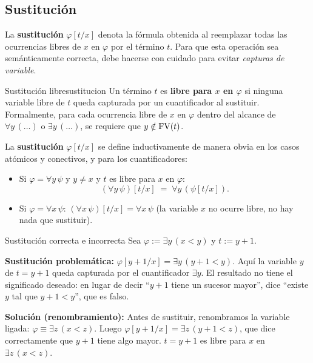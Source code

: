 \subsection{Sustitución}

La \textbf{sustitución} $\varphi[t/x]$ denota la fórmula obtenida al reemplazar todas las ocurrencias libres de $x$ en $\varphi$ por el término $t$. Para que esta operación sea semánticamente correcta, debe hacerse con cuidado para evitar \emph{capturas de variable}.

\begin{definicion}{Sustitución libre}{sustitucion}
Un término $t$ es \textbf{libre para $x$ en $\varphi$} si ninguna variable libre de $t$ queda capturada por un cuantificador al sustituir. Formalmente, para cada ocurrencia libre de $x$ en $\varphi$ dentro del alcance de $\forall y\, (\ldots)$ o $\exists y\, (\ldots)$, se requiere que $y \notin \mathrm{FV}(t)$.

La \textbf{sustitución} $\varphi[t/x]$ se define inductivamente de manera obvia en los casos atómicos y conectivos, y para los cuantificadores:
\begin{itemize}
  \item Si $\varphi = \forall y\, \psi$ y $y \neq x$ y $t$ es libre para $x$ en $\varphi$:
  \[
    (\forall y\, \psi)[t/x] \;=\; \forall y\, (\psi[t/x]).
  \]
  \item Si $\varphi = \forall x\, \psi$: $(\forall x\, \psi)[t/x] = \forall x\, \psi$ (la variable $x$ no ocurre libre, no hay nada que sustituir).
\end{itemize}
\end{definicion}

\begin{ejemplo}{Sustitución correcta e incorrecta}{}
Sea $\varphi := \exists y\, (x < y)$ y $t := y + 1$.

\textbf{Sustitución problemática:} $\varphi[y+1/x] = \exists y\, (y+1 < y)$.
Aquí la variable $y$ de $t = y+1$ queda capturada por el cuantificador $\exists y$. El resultado no tiene el significado deseado: en lugar de decir ``$y+1$ tiene un sucesor mayor'', dice ``existe $y$ tal que $y+1 < y$'', que es falso.

\textbf{Solución (renombramiento):} Antes de sustituir, renombramos la variable ligada: $\varphi \equiv \exists z\,(x < z)$. Luego $\varphi[y+1/x] = \exists z\,(y+1 < z)$, que dice correctamente que $y+1$ tiene algo mayor. $t = y+1$ es libre para $x$ en $\exists z\,(x<z)$.
\end{ejemplo}

